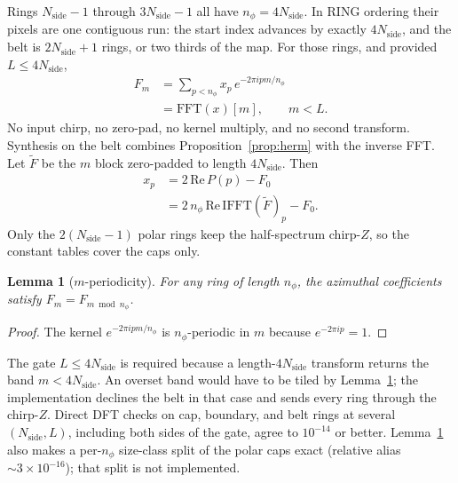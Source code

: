 \documentclass[usenatbib,useAMS]{mnras}
\newtheorem{lemma}{Lemma}
\begin{document}
Rings $N_{\mathrm{side}}-1$ through $3N_{\mathrm{side}}-1$ all have $n_\phi=4N_{\mathrm{side}}$. In RING ordering their pixels are one contiguous run: the start index advances by exactly $4N_{\mathrm{side}}$, and the belt is $2N_{\mathrm{side}}+1$ rings, or two thirds of the map. For those rings, and provided $L\le 4N_{\mathrm{side}}$,
\begin{equation}
\begin{split}
  F_m
  &=\sum_{p<n_\phi}x_p\,e^{-2\pi i p m/n_\phi}\\
  &=\mathrm{FFT}(x)[m],\qquad m<L.
\end{split}
\end{equation}
No input chirp, no zero-pad, no kernel multiply, and no second transform. Synthesis on the belt combines Proposition~\ref{prop:herm} with the inverse FFT. Let $\tilde F$ be the $m$ block zero-padded to length $4N_{\mathrm{side}}$. Then
\begin{equation}
\begin{split}
  x_p
  &= 2\,\mathrm{Re}\,P(p)-F_0\\
  &= 2\,n_\phi\,\mathrm{Re}\,\mathrm{IFFT}(\tilde F)_p-F_0.
\end{split}
\label{eq:belt-synth}
\end{equation}
Only the $2(N_{\mathrm{side}}-1)$ polar rings keep the half-spectrum chirp-$Z$, so the constant tables cover the caps only.

\begin{lemma}[$m$-periodicity]
\label{lem:alias}
For any ring of length $n_\phi$, the azimuthal coefficients satisfy $F_m=F_{m\bmod n_\phi}$.
\end{lemma}

\begin{proof}
The kernel $e^{-2\pi i p m/n_\phi}$ is $n_\phi$-periodic in $m$ because $e^{-2\pi i p}=1$.
\end{proof}

The gate $L\le 4N_{\mathrm{side}}$ is required because a length-$4N_{\mathrm{side}}$ transform returns the band $m<4N_{\mathrm{side}}$. An overset band would have to be tiled by Lemma~\ref{lem:alias}; the implementation declines the belt in that case and sends every ring through the chirp-$Z$. Direct DFT checks on cap, boundary, and belt rings at several $(N_{\mathrm{side}},L)$, including both sides of the gate, agree to $10^{-14}$ or better. Lemma~\ref{lem:alias} also makes a per-$n_\phi$ size-class split of the polar caps exact (relative alias $\sim3\times10^{-16}$); that split is not implemented.
\end{document}
